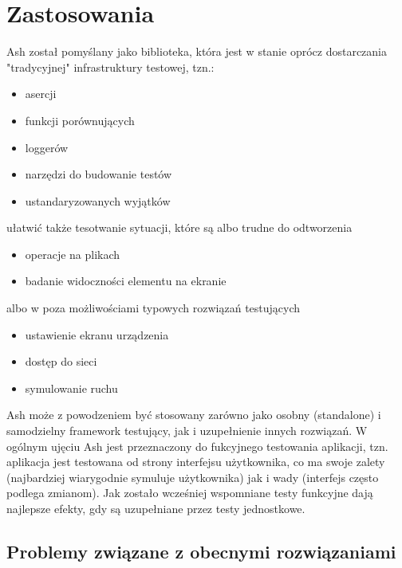 \documentclass[brudnopis]{xmgr}
\begin{document}
\chapter{Zastosowania}
Ash został pomyślany jako biblioteka, która jest w stanie oprócz dostarczania "tradycyjnej" infrastruktury testowej, tzn.:
\begin{itemize}
  \item asercji
  \item funkcji porównujących
  \item loggerów
  \item narzędzi do budowanie testów
  \item ustandaryzowanych wyjątków
\end{itemize}
ułatwić także tesotwanie sytuacji, które są albo trudne do odtworzenia
\begin{itemize}
  \item operacje na plikach
  \item badanie widoczności elementu na ekranie
\end{itemize}
 albo w poza możliwościami typowych rozwiązań testujących
\begin{itemize}
  \item ustawienie ekranu urządzenia
  \item dostęp do sieci
  \item symulowanie ruchu
\end{itemize}
Ash może z powodzeniem być stosowany zarówno jako osobny (standalone) i samodzielny framework testujący, jak i uzupełnienie innych rozwiązań. W ogólnym ujęciu Ash jest przeznaczony do fukcyjnego testowania aplikacji, tzn. aplikacja jest testowana od strony interfejsu użytkownika, co ma swoje zalety (najbardziej wiarygodnie symuluje użytkownika) jak i wady (interfejs często podlega zmianom). Jak zostało wcześniej wspomniane testy funkcyjne dają najlepsze efekty, gdy są uzupełniane przez testy jednostkowe.  

\section{Problemy związane z obecnymi rozwiązaniami}
\end{document}
